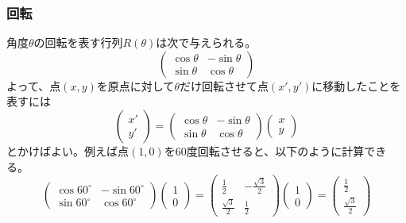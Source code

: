 \documentclass[10pt]{jsreport}
\theoremstyle{definition}%
\newcommand{\kakko}[1]{\left(#1 \right)} %
\numberwithin{equation}{section}%
\begin{document}
\subsubsection{回転}
角度$\theta$の回転を表す行列$R(\theta)$は次で与えられる。
\begin{equation}
  \kakko{\begin{matrix}
    \cos \theta & -\sin \theta\\
    \sin \theta & \cos \theta
  \end{matrix}}
\end{equation}
よって、点$(x,y)$を原点に対して$\theta$だけ回転させて点$(x',y')$に移動したことを表すには
\begin{equation}
    \kakko{\begin{matrix}
      x'\\
      y'
    \end{matrix}}=
    \kakko{\begin{matrix}
      \cos \theta & -\sin \theta\\
      \sin \theta & \cos \theta
    \end{matrix}}\kakko{\begin{matrix}
      x\\
      y
    \end{matrix}}
\end{equation}
とかけばよい。例えば点$(1,0)$を$60$度回転させると、以下のように計算できる。
\begin{equation}
  \kakko{\begin{matrix}
    \cos 60^{\circ} & -\sin 60^{\circ}\\
    \sin 60^{\circ} & \cos 60^{\circ}
  \end{matrix}}\kakko{\begin{matrix}
    1\\
    0
  \end{matrix}}= \kakko{\begin{matrix}
    \frac{1}{2} & -\frac{\sqrt{3}}{2}\\
    \frac{\sqrt{3}}{2} & \frac{1}{2}
  \end{matrix}}\kakko{\begin{matrix}
    1\\
    0
  \end{matrix}}=\kakko{\begin{matrix}
    \frac{1}{2}\\
    \frac{\sqrt{3}}{2}
  \end{matrix}}
\end{equation}
\end{document}
